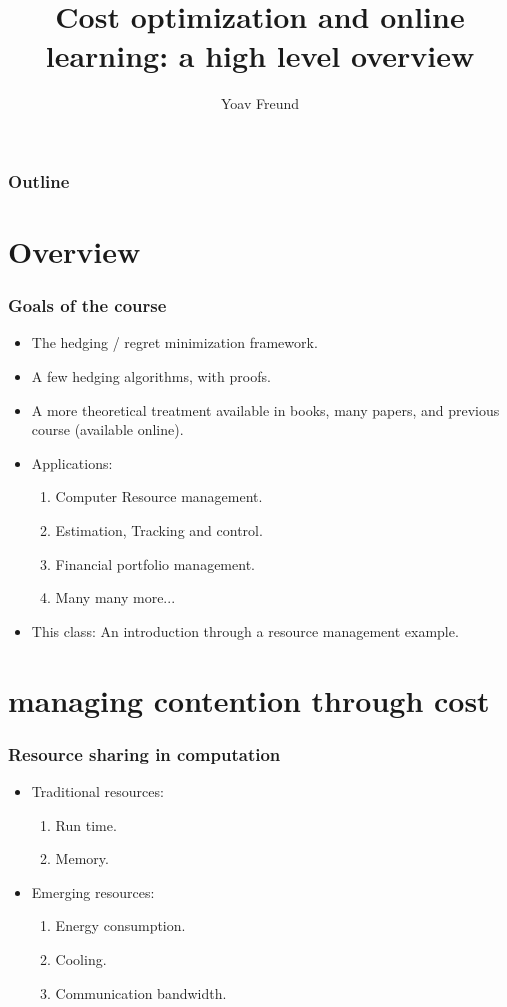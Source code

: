 \documentclass{beamer}
\title%
{Cost optimization and online learning: \newline a high level overview}
\author[Freund] %
{Yoav Freund}
\newcommand{\blue}[1]{{\color{blue} #1}}
\begin{document}
\begin{frame}
  \titlepage
\end{frame}

\begin{frame}
  \frametitle{Outline}
  \tableofcontents
\end{frame}

\section{Overview}

\begin{frame}
\frametitle{Goals of the course}
\begin{itemize}
\item The hedging  / regret minimization framework.
\item A few hedging algorithms, with proofs.
\item A more theoretical treatment available in books, many papers,
  and previous course (available online).
\item Applications:
\begin{enumerate}
\item Computer Resource management.
\item Estimation, Tracking and control.
\item Financial portfolio management.
\item Many many more...
\end{enumerate}
\item \blue{This class:} An introduction through a resource management example.
\end{itemize}
\end{frame}

\section{managing contention through cost}

\begin{frame}
\frametitle{Resource sharing in computation}
\begin{itemize}
\item Traditional resources:
\begin{enumerate}
\item Run time.
\item Memory.
\end{enumerate}
\item Emerging resources:
\begin{enumerate}
\item Energy consumption.
\item Cooling.
\item Communication bandwidth.
\end{enumerate}
\end{itemize}
\end{frame}
\end{document}
